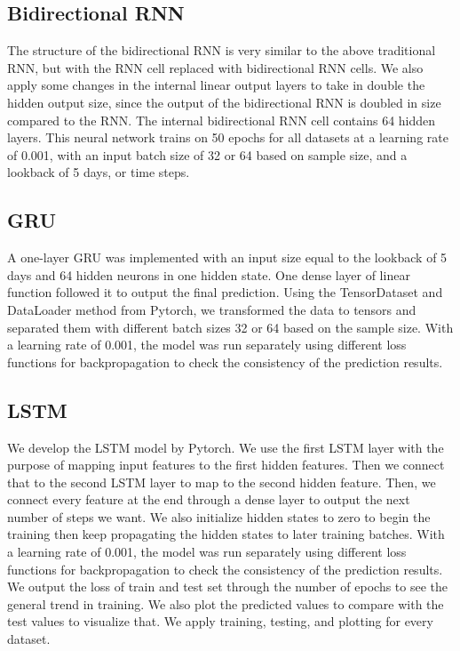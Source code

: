 \documentclass[letterpaper, 10 pt, conference]{ieeeconf}  %
\begin{document}
    \subsection{Bidirectional RNN}
        The structure of the bidirectional RNN is very similar to the above traditional RNN, but with the RNN cell replaced with bidirectional RNN cells. We also apply some changes in the internal linear output layers to take in double the hidden output size, since the output of the bidirectional RNN is doubled in size compared to the RNN. The internal bidirectional RNN cell contains 64 hidden layers. This neural network trains on 50 epochs for all datasets at a learning rate of 0.001, with an input batch size of 32 or 64 based on sample size, and a lookback of 5 days, or time steps. 

    \subsection{GRU}
        A one-layer GRU was implemented with an input size equal to the lookback of 5 days and 64 hidden neurons in one hidden state. One dense layer of linear function followed it to output the final prediction. Using the TensorDataset and DataLoader method from Pytorch, we transformed the data to tensors and separated them with different batch sizes 32 or 64 based on the sample size. With a learning rate of 0.001, the model was run separately using different loss functions for backpropagation to check the consistency of the prediction results.

    \subsection{LSTM}
        We develop the LSTM model by Pytorch. We use the first LSTM layer with the purpose of mapping input features to the first hidden features. Then we connect that to the second LSTM layer to map to the second hidden feature. Then, we connect every feature at the end through a dense layer to output the next number of steps we want. We also initialize hidden states to zero to begin the training then keep propagating the hidden states to later training batches. With a learning rate of 0.001, the model was run separately using different loss functions for backpropagation to check the consistency of the prediction results. We output the loss of train and test set through the number of epochs to see the general trend in training. We also plot the predicted values to compare with the test values to visualize that. We apply training, testing, and plotting for every dataset.
\end{document}

